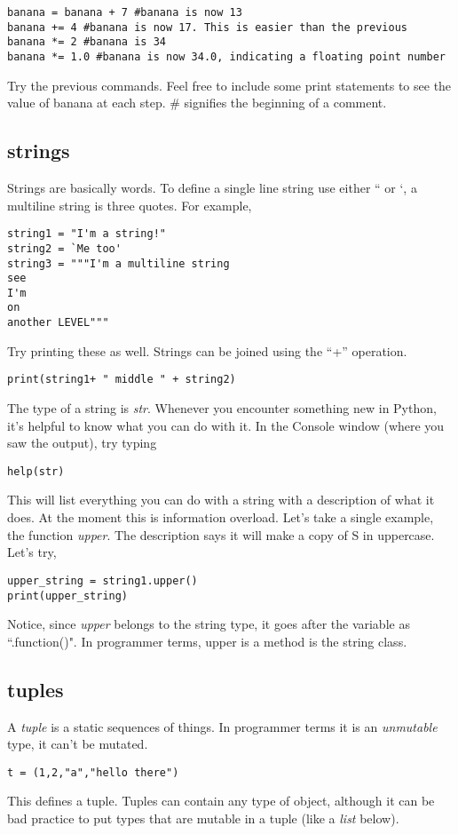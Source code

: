 \documentclass[11pt,letterpaper]{article}
\begin{document}
\begin{verbatim}
banana = banana + 7 #banana is now 13
banana += 4 #banana is now 17. This is easier than the previous
banana *= 2 #banana is 34
banana *= 1.0 #banana is now 34.0, indicating a floating point number
\end{verbatim}
Try the previous commands. Feel free to include some print statements to see the value of banana
at each step. \# signifies the beginning of a comment.


\subsection{strings}
Strings are basically words. To define a single line string use either `` or `, a multiline string
is three quotes. For example,
\begin{verbatim}
string1 = "I'm a string!"
string2 = `Me too'
string3 = """I'm a multiline string
see
I'm 
on 
another LEVEL"""
\end{verbatim}
Try printing these as well. Strings can be joined using the ``+'' operation.
\begin{verbatim}
print(string1+ " middle " + string2)
\end{verbatim}


The type of a string is \emph{str}. Whenever you encounter something
new in Python, it's helpful to know what you can do with it. In the Console window (where you saw
the output), try typing
\begin{verbatim}
help(str)
\end{verbatim}
This will list everything you can do with a string with a description of what it does. At the moment
this is information overload. Let's take a single example, the function \emph{upper}. The description
says it will make a copy of S in uppercase. Let's try,
\begin{verbatim}
upper_string = string1.upper()
print(upper_string)
\end{verbatim}
Notice, since \emph{upper} belongs to the string type, it goes after the variable as ``.function()".
In programmer terms, upper is a method is the string class.


\subsection{tuples}

A \emph{tuple} is a static sequences of things. In programmer terms it is an \emph{unmutable} type,
it can't be mutated. 
\begin{verbatim}
t = (1,2,"a","hello there")
\end{verbatim}
This defines a tuple. Tuples can contain any type of object, although it can be bad practice to put
types that are mutable in a tuple (like a \emph{list} below). 
\end{document}
